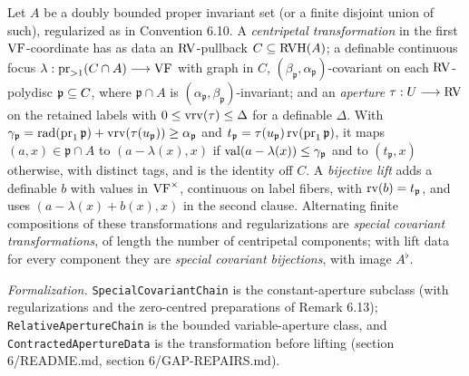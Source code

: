 \setcounter{theorem}{10}
\begin{definition}
\label{defn-special-bijection}
\leanok
{}
Let $A$ be a doubly bounded proper invariant set (or a finite disjoint union of such), regularized as in Convention 6.10. A \emph{centripetal transformation} in the first $\mathrm{VF}$-coordinate has as data an $\mathrm{RV}$-pullback $C\subseteq\operatorname{RVH}(A)$; a definable continuous focus $\lambda:\operatorname{pr}_{>1}(C\cap A)\longrightarrow\mathrm{VF}$ with graph in $C$, $(\beta_{\mathfrak p},\alpha_{\mathfrak p})$-covariant on each $\mathrm{RV}$-polydisc $\mathfrak p\subseteq C$, where $\mathfrak p\cap A$ is $(\alpha_{\mathfrak p},\beta_{\mathfrak p})$-invariant; and an \emph{aperture} $\tau:U\longrightarrow\mathrm{RV}$ on the retained labels with $0\leq\operatorname{vrv}(\tau)\leq\Delta$ for a definable $\Delta$. With $\gamma_{\mathfrak p}=\operatorname{rad}(\operatorname{pr}_1\mathfrak p)+\operatorname{vrv}(\tau(u_{\mathfrak p}))\geq\alpha_{\mathfrak p}$ and $t_{\mathfrak p}=\tau(u_{\mathfrak p})\operatorname{rv}(\operatorname{pr}_1\mathfrak p)$, it maps $(a,x)\in\mathfrak p\cap A$ to $(a-\lambda(x),x)$ if $\operatorname{val}(a-\lambda(x))\leq\gamma_{\mathfrak p}$ and to $(t_{\mathfrak p},x)$ otherwise, with distinct tags, and is the identity off $C$. A \emph{bijective lift} adds a definable $b$ with values in $\mathrm{VF}^\times$, continuous on label fibers, with $\operatorname{rv}(b)=t_{\mathfrak p}$, and uses $(a-\lambda(x)+b(x),x)$ in the second clause. Alternating finite compositions of these transformations and regularizations are \emph{special covariant transformations}, of length the number of centripetal components; with lift data for every component they are \emph{special covariant bijections}, with image $A^\flat$.

\emph{Formalization.} \texttt{SpecialCovariantChain} is the constant-aperture subclass (with regularizations and the zero-centred preparations of Remark 6.13); \texttt{RelativeApertureChain} is the bounded variable-aperture class, and \texttt{ContractedApertureData} is the transformation before lifting (section 6/README.md, section 6/GAP-REPAIRS.md).
\end{definition}

